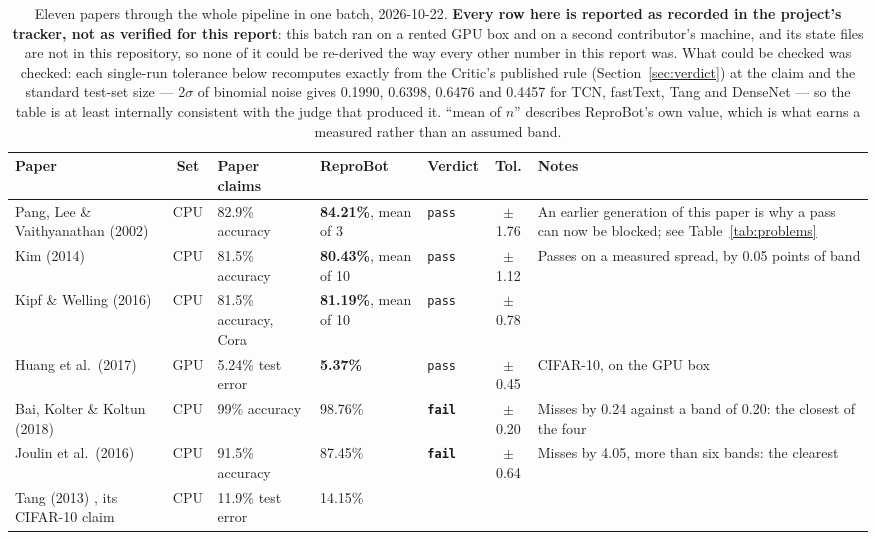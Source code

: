 \documentclass[11pt]{article}
\newcommand{\squeeze}{\setlength{\tabcolsep}{4pt}}
\begin{document}
\begin{table}[tbp]
\centering
\small
\caption{Eleven papers through the whole pipeline in one batch, 2026-10-22. \textbf{Every row
here is reported as recorded in the project's tracker, not as verified for this report}: this
batch ran on a rented GPU box and on a second contributor's machine, and its state files are not
in this repository, so none of it could be re-derived the way every other number in this report
was. What could be checked was checked: each single-run tolerance below recomputes exactly from
the Critic's published rule (Section~\ref{sec:verdict}) at the claim and the standard test-set
size --- 2$\sigma$ of binomial noise gives 0.1990, 0.6398, 0.6476 and 0.4457 for TCN, fastText,
Tang and DenseNet --- so the table is at least internally consistent with the judge that produced
it. ``mean of $n$'' describes ReproBot's own value, which is what earns a measured rather than an
assumed band.}
\label{tab:batch}
\squeeze
\begin{tabular}{L{0.175\textwidth}cL{0.115\textwidth}L{0.13\textwidth}L{0.075\textwidth}cL{0.235\textwidth}}
\toprule
Paper & Set & Paper claims & ReproBot & Verdict & Tol. & Notes \\
\midrule
Pang, Lee \& Vaithyanathan (2002) \cite{pang2002thumbs} & CPU & 82.9\% accuracy &
  \textbf{84.21\%}, mean of 3 & \texttt{pass} & $\pm$1.76 & An earlier generation of this paper
  is why a pass can now be blocked; see Table~\ref{tab:problems} \\
Kim (2014) \cite{kim2014cnn} & CPU & 81.5\% accuracy & \textbf{80.43\%}, mean of 10 &
  \texttt{pass} & $\pm$1.12 & Passes on a measured spread, by 0.05 points of band \\
Kipf \& Welling (2016) \cite{kipf2017gcn} & CPU & 81.5\% accuracy, Cora &
  \textbf{81.19\%}, mean of 10 & \texttt{pass} & $\pm$0.78 & \\
Huang et al.\ (2017) \cite{huang2017densenet} & GPU & 5.24\% test error &
  \textbf{5.37\%} & \texttt{pass} & $\pm$0.45 & CIFAR-10, on the GPU box \\
\midrule
Bai, Kolter \& Koltun (2018) \cite{bai2018tcn} & CPU & 99\% accuracy & 98.76\% &
  \textbf{\texttt{fail}} & $\pm$0.20 & Misses by 0.24 against a band of 0.20: the closest of the
  four \\
Joulin et al.\ (2016) \cite{joulin2016fasttext} & CPU & 91.5\% accuracy & 87.45\% &
  \textbf{\texttt{fail}} & $\pm$0.64 & Misses by 4.05, more than six bands: the clearest \\
Tang (2013) \cite{tang2013dlsvm}, its CIFAR-10 claim & CPU & 11.9\% test error & 14.15\% &

\end{tabular}
\end{table}
\end{document}
